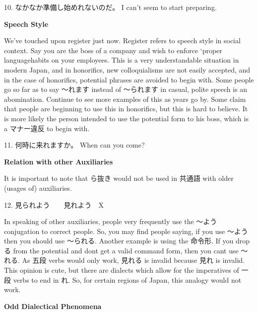 \par{10. なかなか準備し始めれないのだ。 \hfill\break
I can't seem to start preparing. }

\par{ \textbf{Speech Style }}

\par{ We've touched upon register just now. Register refers to speech style in social context. Say you are the boss of a company and wish to enforce ‘proper language\textquotesingle  habits on your employees. This is a very understandable situation in modern Japan, and in honorifics, new colloquialisms are not easily accepted, and in the case of honorifics, potential phrases are avoided to begin with. Some people go so far as to say ～れます instead of ～られます in casual, polite speech is an abomination. Continue to see more examples of this as years go by. Some claim that people are beginning to use this in honorifics, but this is hard to believe. It is more likely the person intended to use the potential form to his boss, which is a マナー違反 to begin with. }

\par{11. 何時に来れますか。 \hfill\break
When can you come? }

\begin{center}
\textbf{Relation with other Auxiliaries }
\end{center}

\par{ It is important to note that ら抜き would not be used in 共通語 with older (usages of) auxiliaries. }

\par{12. 見られよう　\textrightarrow 　見れよう　X  }

\par{ In speaking of other auxiliaries, people very frequently use the ～よう conjugation to correct people. So, you may find people saying, if you use ～よう then you should use ～られる. Another example is using the 命令形. If you drop る from the potential and don\textquotesingle t get a valid command form, then you can\textquotesingle t use ～れる. As 五段 verbs would only work, 見れる is invalid because 見れ is invalid. This opinion is cute, but there are dialects which allow for the imperatives of 一段 verbs to end in れ. So, for certain regions of Japan, this analogy would not work. }

\begin{center}
 \textbf{Odd Dialectical Phenomena }
\end{center}

